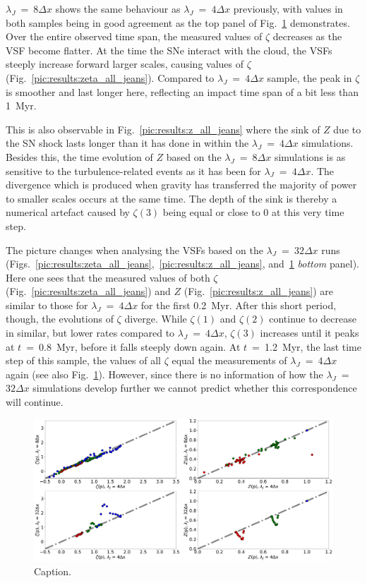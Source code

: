 $\lambda_J$~=~$8\Delta{}x$ shows the same behaviour as $\lambda_J$~=~$4\Delta{}x$ previously, with values in both samples being in good agreement as the top panel of Fig.~\ref{pic:results:jeans_comp} demonstrates. 
Over the entire observed time span, the measured values of $\zeta$ decreases as the VSF become flatter.
At the time the SNe interact with the cloud, the VSFs steeply increase forward larger scales, causing values of $\zeta$ (Fig.~\ref{pic:results:zeta_all_jeans}).
Compared to $\lambda_J$~=~$4\Delta{}x$ sample, the peak in $\zeta$ is smoother and last longer here, reflecting an impact time span of a bit less than 1~Myr.

This is also observable in Fig.~\ref{pic:results:z_all_jeans} where the sink of $Z$ due to the SN shock lasts longer than it has done in within the $\lambda_J$~=~$4\Delta{}x$ simulations. 
Besides this, the time evolution of $Z$ based on the $\lambda_J$~=~$8\Delta{}x$ simulations is as sensitive to the turbulence-related events as it has been for $\lambda_J$~=~$4\Delta{}x$.
The divergence which is produced when gravity has transferred the majority of power to smaller scales occurs at the same time. 
The depth of the sink is thereby a numerical artefact caused by $\zeta(3)$ being equal or close to 0 at this very time step. 

The picture changes when analysing the VSFs based on the $\lambda_J$~=~$32\Delta{}x$ runs (Figs.~\ref{pic:results:zeta_all_jeans},~\ref{pic:results:z_all_jeans}, and~\ref{pic:results:jeans_comp} \textit{bottom} panel).
Here one sees that the measured values of both $\zeta$ (Fig.~\ref{pic:results:zeta_all_jeans}) and $Z$ (Fig.~\ref{pic:results:z_all_jeans}) are similar to those for $\lambda_J$~=~$4\Delta{}x$ for the first 0.2~Myr.
After this short period, though, the evolutions of $\zeta$ diverge. 
While $\zeta(1)$ and $\zeta(2)$ continue to decrease in similar, but lower rates compared to $\lambda_J$~=~$4\Delta{}x$, $\zeta(3)$ increases until it peaks at $t$~=~0.8~Myr, before it falls steeply down again.
At $t$~=~1.2~Myr, the last time step of this sample, the values of all $\zeta$ equal the measurements of $\lambda_J$~=~$4\Delta{}x$ again (see also Fig.~\ref{pic:results:jeans_comp}). 
However, since there is no information of how the $\lambda_J$~=~$32\Delta{}x$ simulations develop further we cannot predict whether this correspondence will continue. 

\begin{figure}
	\centering
    \includegraphics[width=\textwidth]{comp_jeans.pdf}
    \caption{Caption.}
    \label{pic:results:jeans_comp}
\end{figure}

